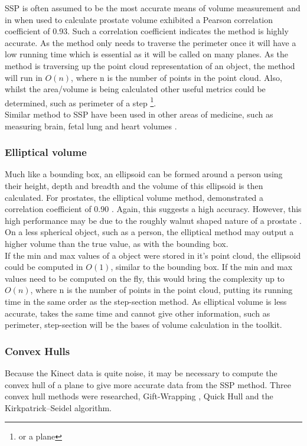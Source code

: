 SSP is often assumed to be the most accurate means of volume measurement and in when used to calculate prostate volume \cite{K1991} exhibited a Pearson correlation coefficient of 0.93. 
Such a correlation coefficient indicates the method is highly accurate.
As the method only needs to traverse the perimeter once it will have a low running time which is essential as it will be called on many planes. As the method is traversing up the point cloud representation of an object, the method will run in $O(n)$, where n is the number of points in the point cloud. Also, whilst the area/volume is being calculated other useful metrics could be determined, such as perimeter of a step \footnote{or a plane}.\\

Similar method to SSP have been used in other areas of medicine, such as measuring brain, fetal lung and heart volumes \cite{Rosen1990,Rypens2001,Graham1971}.\\

\subsubsection{Elliptical volume}
Much like a bounding box, an ellipsoid can be formed around a person using their height, depth and breadth and the volume of this ellipsoid is then calculated.
For prostates, the elliptical volume method, demonstrated a correlation coefficient of 0.90 \cite{K1991}. Again, this suggests a high accuracy.
However, this high performance may be due to the roughly walnut shaped nature of a prostate \cite{D2003}. 
On a less spherical object, such as a person, the elliptical method may output a higher volume than the true value, as with the bounding box.\\

If the min and max values of a object were stored in it's point cloud, the ellipsoid could be computed in $O(1)$, similar to the bounding box. 
If the min and max values need to be computed on the fly, this would bring the complexity up to $O(n)$, where n is the number of points in the point cloud, putting its running time in the same order as the step-section method.
As elliptical volume is less accurate, takes the same time and cannot give other information, such as perimeter, step-section will be the bases of volume calculation in the toolkit.

\subsubsection{Convex Hulls}
Because the Kinect data is quite noise, it may be necessary to compute the convex hull of a plane to give more accurate data from the SSP method. Three convex hull methods were researched, Gift-Wrapping \cite{Cormen2001}, Quick Hull and the Kirkpatrick–Seidel algorithm.\\

